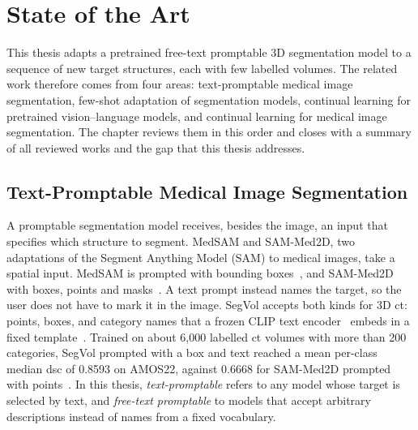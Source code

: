 %
%

\chapter{State of the Art}
\label{chap:sota}

This thesis adapts a pretrained free-text promptable 3D segmentation model to a sequence of new target structures, each with few labelled volumes.
The related work therefore comes from four areas: text-promptable medical image segmentation, few-shot adaptation of segmentation models, continual learning for pretrained vision--language models, and continual learning for medical image segmentation.
The chapter reviews them in this order and closes with a summary of all reviewed works and the gap that this thesis addresses.

\section{Text-Promptable Medical Image Segmentation}
\label{sec:text-promptable-seg}

A promptable segmentation model receives, besides the image, an input that specifies which structure to segment.
MedSAM and SAM-Med2D, two adaptations of the Segment Anything Model (SAM) to medical images, take a spatial input.
MedSAM is prompted with bounding boxes~\cite{Ma_2024}, and SAM-Med2D with boxes, points and masks~\cite{cheng2023sammed2d}.
A text prompt instead names the target, so the user does not have to mark it in the image.
SegVol accepts both kinds for 3D \gls{ct}: points, boxes, and category names that a frozen CLIP text encoder~\cite{radford2021learningtransferablevisualmodels} embeds in a fixed template~\cite{du2025segvoluniversalinteractivevolumetric}.
Trained on about 6{,}000 labelled \gls{ct} volumes with more than 200 categories, SegVol prompted with a box and text reached a mean per-class median \gls{dsc} of 0.8593 on AMOS22, against 0.6668 for SAM-Med2D prompted with points~\cite{du2025segvoluniversalinteractivevolumetric}.
In this thesis, \emph{text-promptable} refers to any model whose target is selected by text, and \emph{free-text promptable} to models that accept arbitrary descriptions instead of names from a fixed vocabulary.

